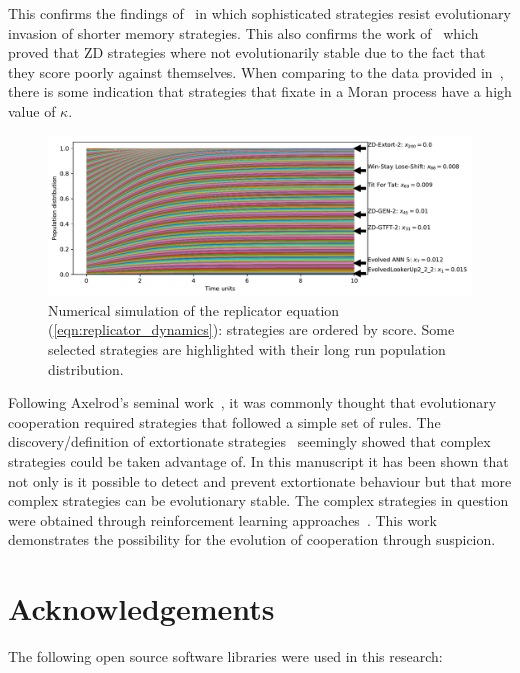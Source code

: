 \documentclass[a4paper]{article}
\begin{document}
This confirms the
findings of~\cite{Moran1707} in which sophisticated strategies resist
evolutionary invasion of shorter memory strategies. This also confirms the work
of~\cite{adami2013evolutionary, hilbe2015partners} which proved that ZD
strategies where not evolutionarily stable due to the fact that they score
poorly against themselves. When comparing to the data provided
in~\cite{Moran1707}, there is some indication that strategies that fixate in a
Moran process have a high value of \(\kappa\).

\begin{figure}[!htbp]
    \centering
    \includegraphics[width=.8\textwidth]{./assets/img/replicator_dynamics/main.pdf}
    \caption{Numerical simulation of the replicator equation
    (\ref{eqn:replicator_dynamics}): strategies are ordered by score. Some
    selected strategies are highlighted with their long run population
    distribution.}
    \label{fig:replicator_dynamics}
\end{figure}

Following Axelrod's seminal work~\cite{Axelrod1980, Axelrod1980a}, it was
commonly thought that evolutionary cooperation required strategies that followed
a simple set of rules. The discovery/definition of extortionate
strategies~\cite{Press2012} seemingly showed that complex strategies could be
taken advantage of. In this manuscript it has been shown that not only is it
possible to detect and prevent extortionate behaviour but that more complex
strategies can be evolutionary stable. The complex strategies in question were
obtained through reinforcement learning approaches~\cite{Harper2017, Moran1707}.
This work demonstrates the possibility for the evolution of cooperation
through suspicion.

\section*{Acknowledgements}

The following open source software libraries were used in this research:
\end{document}
